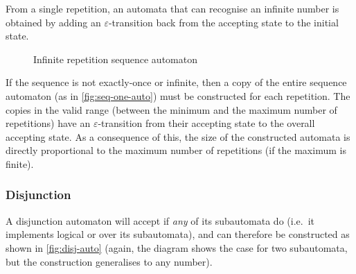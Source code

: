 From a single repetition, an automata that can recognise an infinite number is
obtained by adding an $\varepsilon$-transition back from the accepting state to
the initial state.

\begin{figure}[ht]
  \centering
  \caption{Infinite repetition sequence automaton}
  \label{fig:seq-inf-auto}
\end{figure}

If the sequence is not exactly-once or infinite, then a copy of the entire
sequence automaton (as in \autoref{fig:seq-one-auto}) must be constructed for
each repetition. The copies in the valid range (between the minimum and the
maximum number of repetitions) have an $\varepsilon$-transition from their
accepting state to the overall accepting state. As a consequence of this, the
size of the constructed automata is directly proportional to the maximum number
of repetitions (if the maximum is finite).

\subsubsection{Disjunction}

A disjunction automaton will accept if \emph{any} of its subautomata do (i.e.\
it implements logical or over its subautomata), and can therefore be constructed
as shown in \autoref{fig:disj-auto} (again, the diagram shows the case for two
subautomata, but the construction generalises to any number).

